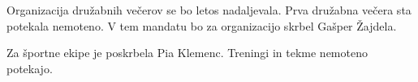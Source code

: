 \documentclass{seja}
\begin{document}
\begin{ad}
	
	\item
	Organizacija družabnih večerov se bo letos nadaljevala. Prva družabna večera sta potekala nemoteno. V tem mandatu bo za organizacijo skrbel Gašper Žajdela. 
	
	Za športne ekipe je poskrbela Pia Klemenc. Treningi in tekme nemoteno potekajo.
\end{ad}

\makeatletter \global\let\@enddocumenthook\@empty \makeatother
{}
\end{document}
